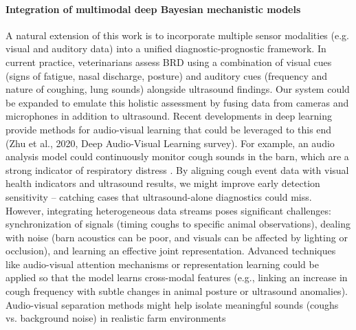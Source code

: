 \paragraph{Integration of multimodal deep Bayesian mechanistic models} A natural extension of this work is to incorporate multiple sensor modalities (e.g. visual and auditory data) into a unified diagnostic-prognostic framework. In current practice, veterinarians assess BRD using a combination of visual cues (signs of fatigue, nasal discharge, posture) and auditory cues (frequency and nature of coughing, lung sounds) alongside ultrasound findings. Our system could be expanded to emulate this holistic assessment by fusing data from cameras and microphones in addition to ultrasound. Recent developments in deep learning provide methods for audio-visual learning that could be leveraged to this end (Zhu et al., 2020, Deep Audio-Visual Learning survey). For example, an audio analysis model could continuously monitor cough sounds in the barn, which are a strong indicator of respiratory distress \cite{10.1371/journal.pone.0123111}. By aligning cough event data with visual health indicators and ultrasound results, we might improve early detection sensitivity – catching cases that ultrasound-alone diagnostics could miss. However, integrating heterogeneous data streams poses significant challenges: synchronization of signals (timing coughs to specific animal observations), dealing with noise (barn acoustics can be poor, and visuals can be affected by lighting or occlusion), and learning an effective joint representation. Advanced techniques like audio-visual attention mechanisms or representation learning could be applied so that the model learns cross-modal features (e.g., linking an increase in cough frequency with subtle changes in animal posture or ultrasound anomalies). Audio-visual separation methods might help isolate meaningful sounds (coughs vs. background noise) in realistic farm environments 
